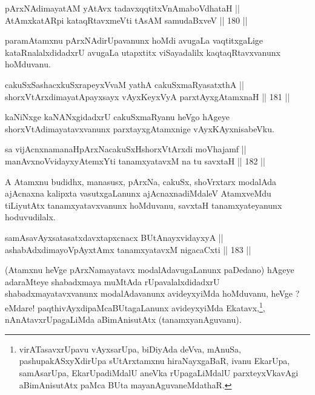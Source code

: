 \begin{shl}
pArxNAdimayatAM yAtAvx tadavxqqtitxVnAmaboVdhataH || \\
AtAmx\s katAR\s pi kataqRtavxmeVti tAsAM samudaBxveV \hfill || 180 ||  
\end{shl}

\begin{artha}
paramAtamxnu pArxNAdirUpavanunx hoMdi avugaLa vaqtitxgaLige
kataRnalalxdidadxrU avugaLa utapxtitx viSayadalilx kaqtaqRtavxvanunx
hoMduvanu.
\end{artha}


\begin{shl}
cakuSxSashacxkuSxrapeyxVvaM yathA cakuSxmaRyasatxthA || \\
shorxVtArxdimayatA\s payxsayx vAyxKeyxVyA parxtAyxgAtamxnaH \hfill || 181 ||  
\end{shl}

\begin{artha}
kaNiNxge kaNANxgidadxrU cakuSxmaRyanu heVgo hAgeye
shorxVtAdimayatavxvanunx parxtayxgAtamxnige vAyxKAyxnisabeVku.
\end{artha}

\begin{shl}
sa vijAcnxnamanaHpArxNacakuSxHshorxVtArxdi moVhajamf || \\
manAvxnoV\s vidayxyA\s \s temxYti tanamxyatavxM na tu savxtaH \hfill || 182 ||  
\end{shl}

\begin{artha}
A Atamxnu budidhx, manasusx, pArxNa, cakuSx, shoVrxtarx modalAda ajAcnaxna kalipxta vasutxgaLanunx ajAcnaxnadiMdaleV AtamxveMdu tiLiyutAtx tanamxyatavxvanunx hoMduvanu, savxtaH tanamxyateyanunx hoduvudilalx.
\end{artha}



\begin{shl}
samAsavAyxsatasatxdavxtapxcnacx BUtAnayxvidayxyA || \\
ashabAdxdimayoV\s pAyxtAmx tanamxyatavxM nigacaCxti \hfill || 183 ||  
\end{shl}

\begin{artha}
(Atamxnu heVge pArxNamayatavx modalAdavugaLanunx paDedano) hAgeye
adaraMteye shabadxmaya muMtAda rUpavalalxdidadxrU
shabadxmayatavxvanunx modalAdavanunx avideyxyiMda hoMduvanu, heVge ?
eMdare! paqthivAyxdipaMcaBUtagaLanunx avideyxyiMda
Ekatavx,\footnote[1 2]{virATasavxrUpavu vAyxsarUpa, biDiyAda deVva,
mAnuSa, pashupakASxyXdirUpa sUtArxtamxnu hiraNayxgaBaR, ivanu
EkarUpa, samAsarUpa, EkarUpadiMdalU aneVka rUpagaLiMdalU
parxteyxVkavAgi aBimAnisutAtx paMca BUta mayanAguvaneMdathaR.}, nAnAtavx\footnotemark rUpagaLiMda aBimAnisutAtx
(tanamxyanAguvanu).
\end{artha}

